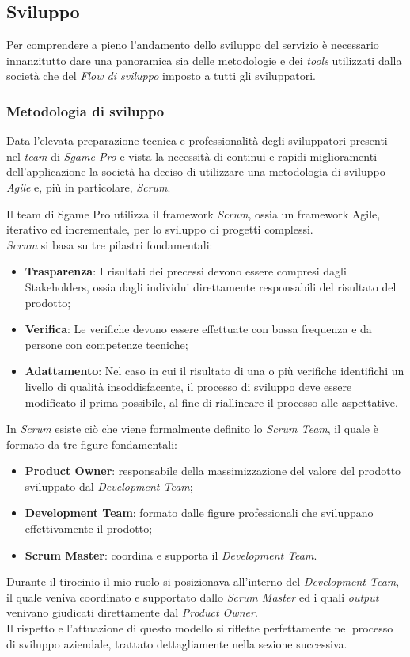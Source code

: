 \documentclass[11pt]{thesistemp}
\begin{document}
\pagebreak
\subsection{Sviluppo}
Per comprendere a pieno l'andamento dello sviluppo del servizio è necessario innanzitutto dare una panoramica sia delle metodologie e dei \textit{tools} utilizzati dalla società che del \textit{Flow di sviluppo} imposto a tutti gli sviluppatori.

\subsubsection{Metodologia di sviluppo}
Data l'elevata preparazione tecnica e professionalità degli sviluppatori presenti nel \textit{team} di \textit{Sgame Pro} e vista la necessità di continui e rapidi miglioramenti dell'applicazione la società ha deciso di utilizzare una metodologia di sviluppo \textit{Agile} e, più in particolare, \textit{Scrum}.

Il team di Sgame Pro utilizza il framework \textit{Scrum}, ossia un framework Agile, iterativo ed incrementale, per lo sviluppo di progetti complessi.\\
\textit{Scrum} si basa su tre pilastri fondamentali:
\begin{itemize}
	\item \textbf{Trasparenza}: I risultati dei precessi devono essere compresi dagli Stakeholders, ossia dagli individui direttamente responsabili del risultato del prodotto;
	\item \textbf{Verifica}: Le verifiche devono essere effettuate con bassa frequenza e da persone con competenze tecniche;
	\item \textbf{Adattamento}: Nel caso in cui il risultato di una o più verifiche identifichi un livello di qualità insoddisfacente, il processo di sviluppo deve essere modificato il prima possibile, al fine di riallineare il processo alle aspettative.
\end{itemize}
In \textit{Scrum} esiste ciò che viene formalmente definito lo \textit{Scrum Team}, il quale è formato da tre figure fondamentali:
\begin{itemize}
	\item \textbf{Product Owner}: responsabile della massimizzazione del valore del prodotto sviluppato dal \textit{Development Team};
	\item \textbf{Development Team}: formato dalle figure professionali che sviluppano effettivamente il prodotto;
	\item \textbf{Scrum Master}: coordina e supporta il \textit{Development Team}.
\end{itemize}
Durante il tirocinio il mio ruolo si posizionava all'interno del \textit{Development Team}, il quale veniva coordinato e supportato dallo \textit{Scrum Master} ed i quali \textit{output} venivano giudicati direttamente dal \textit{Product Owner}.\\
Il rispetto e l'attuazione di questo modello si riflette perfettamente nel processo di sviluppo aziendale, trattato dettagliamente nella sezione successiva.
\end{document}

